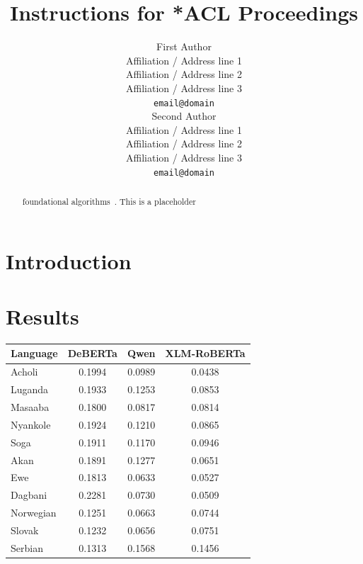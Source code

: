 \documentclass[11pt]{article}
\title{Instructions for *ACL Proceedings}
\author{First Author \\ Affiliation / Address line 1 \\ Affiliation / Address
line 2 \\ Affiliation / Address line 3 \\ \texttt{email@domain} \\\And Second
Author \\ Affiliation / Address line 1 \\ Affiliation / Address line 2 \\
Affiliation / Address line 3 \\ \texttt{email@domain} \\}
\begin{document}
    \maketitle
    \begin{abstract}
        foundational algorithms~\citep{Aho:72}. This is a placeholder
    \end{abstract}

    \section{Introduction}

    \section{Results}
    \begin{table}[htbp]
        \centering
        \vspace{0.5em}
        \small
        \begin{tabular}{lccc}
            \toprule \textbf{Language} & \textbf{DeBERTa} & \textbf{Qwen} & \textbf{XLM-RoBERTa} \\
            \midrule Acholi            & 0.1994           & 0.0989        & 0.0438               \\
            Luganda                    & 0.1933           & 0.1253        & 0.0853               \\
            Masaaba                    & 0.1800           & 0.0817        & 0.0814               \\
            Nyankole                   & 0.1924           & 0.1210        & 0.0865               \\
            Soga                       & 0.1911           & 0.1170        & 0.0946               \\
            Akan                       & 0.1891           & 0.1277        & 0.0651               \\
            Ewe                        & 0.1813           & 0.0633        & 0.0527               \\
            Dagbani                    & 0.2281           & 0.0730        & 0.0509               \\
            Norwegian                  & 0.1251           & 0.0663        & 0.0744               \\
            Slovak                     & 0.1232           & 0.0656        & 0.0751               \\
            Serbian                    & 0.1313           & 0.1568        & 0.1456               \\

\end{tabular}
\end{table}
\end{document}
